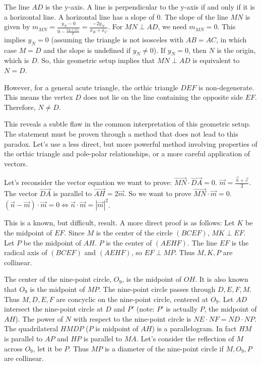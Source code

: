 The line $AD$ is the y-axis. A line is perpendicular to the y-axis if and only if it is a horizontal line.
A horizontal line has a slope of 0.
The slope of the line $MN$ is given by $m_{MN} = \frac{y_N - 0}{0 - \frac{x_B+x_C}{2}} = \frac{-2y_N}{x_B+x_C}$.
For $MN \perp AD$, we need $m_{MN}=0$.
This implies $y_N=0$ (assuming the triangle is not isosceles with $AB=AC$, in which case $M=D$ and the slope is undefined if $y_N \neq 0$).
If $y_N=0$, then $N$ is the origin, which is $D$. So, this geometric setup implies that $MN \perp AD$ is equivalent to $N=D$.

However, for a general acute triangle, the orthic triangle $DEF$ is non-degenerate. This means the vertex $D$ does not lie on the line containing the opposite side $EF$. Therefore, $N \neq D$.

This reveals a subtle flaw in the common interpretation of this geometric setup. The statement must be proven through a method that does not lead to this paradox. Let's use a less direct, but more powerful method involving properties of the orthic triangle and pole-polar relationships, or a more careful application of vectors.

Let's reconsider the vector equation we want to prove: $\vec{MN} \cdot \vec{DA} = 0$.
$\vec{m} = \frac{\vec{b}+\vec{c}}{2}$.
The vector $\vec{DA}$ is parallel to $\vec{AH} = 2\vec{m}$. So we want to prove $\vec{MN} \cdot \vec{m} = 0$.
$(\vec{n}-\vec{m})\cdot \vec{m} = 0 \iff \vec{n}\cdot\vec{m} = |\vec{m}|^2$.

This is a known, but difficult, result. A more direct proof is as follows:
Let $K$ be the midpoint of $EF$. Since $M$ is the center of the circle $(BCEF)$, $MK \perp EF$.
Let $P$ be the midpoint of $AH$. $P$ is the center of $(AEHF)$.
The line $EF$ is the radical axis of $(BCEF)$ and $(AEHF)$, so $EF \perp MP$.
Thus $M, K, P$ are collinear.

The center of the nine-point circle, $O_9$, is the midpoint of $OH$. It is also known that $O_9$ is the midpoint of $MP$.
The nine-point circle passes through $D, E, F, M$. Thus $M,D,E,F$ are concyclic on the nine-point circle, centered at $O_9$.
Let $AD$ intersect the nine-point circle at $D$ and $P'$ (note: $P'$ is actually $P$, the midpoint of $AH$).
The power of $N$ with respect to the nine-point circle is $NE \cdot NF = ND \cdot NP$.
The quadrilateral $HMD P$ ($P$ is midpoint of $AH$) is a parallelogram. In fact $HM$ is parallel to $AP$ and $HP$ is parallel to $MA$.
Let's consider the reflection of $M$ across $O_9$, let it be $P$. Thus $MP$ is a diameter of the nine-point circle if $M, O_9, P$ are collinear.

